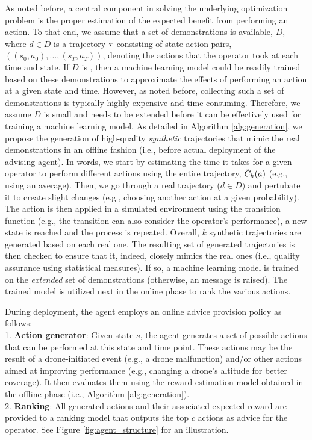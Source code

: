 As noted before, a central component in solving the underlying optimization problem is the proper estimation of the expected benefit from performing an action. To that end, we assume that a set of demonstrations is available, $D$,  where $d\in D$ is a trajectory $\tau$ consisting of state-action pairs, $((s_0,a_0),...,(s_T,a_T))$, denoting the actions that the operator took at each time and state. If $D$ is , then a machine learning model could be readily trained based on these demonstrations to approximate the effects of performing an action at a given state and time. However, as noted before, collecting such a set of demonstrations is typically highly expensive and time-consuming. Therefore, we assume $D$ is small and needs to be extended before it can be effectively used for training a machine learning model. As detailed in Algorithm \ref{alg:generation}, we propose the generation of high-quality \textit{synthetic} trajectories that mimic the real demonstrations in an offline fashion (i.e., before actual deployment of the advising agent). 
In words, we start by estimating the time it takes for a given operator to perform different actions using the entire trajectory, $\Tilde{C}_h(a)$ (e.g., using an average). Then, we go through a real trajectory ($d\in D)$ and pertubate it to create slight changes (e.g., choosing another action at a given probability). The action is then applied in a simulated environment using the transition function (e.g., the transition can also consider the operator's performance), a new state is reached and the process is repeated. Overall, $k$ synthetic trajectories are generated based on each real one. 
The resulting set of generated trajectories is then checked to ensure that it, indeed, closely mimics the real ones (i.e., quality assurance using statistical measures). If so, a machine learning model is trained on the \textit{extended} set of demonstrations (otherwise, an  message is raised). 
The trained model is utilized next in the online phase to rank the various actions.

During deployment, the agent employs an online advice provision policy as follows:  \\
{1. \bf Action generator}: Given state $s$, the agent generates a set of possible actions that can be performed at this state and time point. These actions may be the result of a drone-initiated event (e.g., a drone malfunction) and/or other actions aimed at improving performance (e.g., changing a drone's altitude for better coverage). It then evaluates them using the reward estimation model obtained in the offline phase (i.e., Algorithm \ref{alg:generation}). \\
{2. \bf Ranking}: All generated actions and their associated expected reward are provided to a ranking model that outputs the top $c$ actions as advice for the operator. See Figure \ref{fig:agent_structure} for an illustration. 
 
